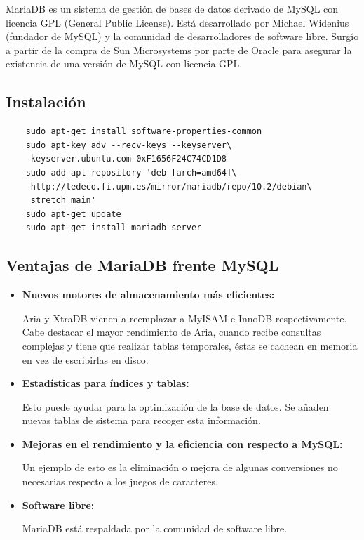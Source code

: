 \documentclass[openright,twoside,10pt]{book}
\begin{document}
    MariaDB es un sistema de gestión de bases de datos derivado de MySQL con
    licencia GPL (General Public License). Está desarrollado por Michael
    Widenius (fundador de MySQL) y la comunidad de desarrolladores de
    software libre. Surgío a partir de la compra de Sun Microsystems por
    parte de Oracle para asegurar la existencia de una versión de MySQL con
    licencia GPL.
    
    \subsection{Instalación}\label{instalaciuxf3n-4}
    
    \begin{verbatim}
    sudo apt-get install software-properties-common
    sudo apt-key adv --recv-keys --keyserver\
     keyserver.ubuntu.com 0xF1656F24C74CD1D8
    sudo add-apt-repository 'deb [arch=amd64]\
     http://tedeco.fi.upm.es/mirror/mariadb/repo/10.2/debian\
     stretch main'
    sudo apt-get update
    sudo apt-get install mariadb-server
    \end{verbatim}
    
    \subsection{\texorpdfstring{Ventajas de MariaDB frente MySQL
    \cite{zeokat_mariadb, andergonzalez_mariadb, alidavergara_mariadb}}{Ventajas de MariaDB frente MySQL }}\label{ventajas-de-mariadb-frente-mysql}
    
    \begin{itemize}
    \item
      \textbf{Nuevos motores de almacenamiento más eficientes:}
    
      Aria y XtraDB vienen a reemplazar a MyISAM e InnoDB respectivamente.
      Cabe destacar el mayor rendimiento de Aria, cuando recibe consultas
      complejas y tiene que realizar tablas temporales, éstas se cachean en
      memoria en vez de escribirlas en disco.
    \item
      \textbf{Estadísticas para índices y tablas:}
    
      Esto puede ayudar para la optimización de la base de datos. Se añaden
      nuevas tablas de sistema para recoger esta información.
    \item
      \textbf{Mejoras en el rendimiento y la eficiencia con respecto a
      MySQL:}
    
      Un ejemplo de esto es la eliminación o mejora de algunas conversiones
      no necesarias respecto a los juegos de caracteres.
    \item
      \textbf{Software libre:}
    
      MariaDB está respaldada por la comunidad de software libre.
    \end{itemize}
    
\end{document}
